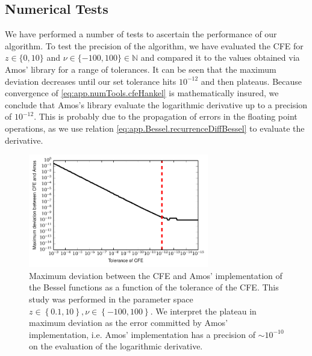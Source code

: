 
\subsection{Numerical Tests}
We have performed a number of tests to ascertain the performance of our algorithm. 
To test the precision of the algorithm, we have evaluated the CFE for $z\in\{0,10\}$
and $\nu\in\{-100,100\}\in\mathbb{N}$ and compared it to the values obtained via
Amos' library for a range of tolerances. It can be seen that the maximum deviation 
decreases until our set tolerance hits $10^{-12}$ and then plateaus. Because 
convergence of \ref{eq:app.numTools.cfeHankel} is mathematically insured, we 
conclude that Amos's library evaluate the logarithmic derivative up to 
a precision of $10^{-12}$. This is probably due to the propagation 
of errors in the floating point operations, as we use relation
\eqref{eq:app.Bessel.recurrenceDiffBessel}
to evaluate the derivative. 

\begin{figure}
 \centering
 \includegraphics[width=0.7\textwidth]{figs/app-numTools/maxDiff.pdf}
 \caption[Maximum deviation between the CFE and Amos' implementation as a function
	  of the CFE tolerance]%
	 {Maximum deviation between the CFE and Amos' implementation of the Bessel functions
	 as a function of the tolerance of the CFE. This study was performed in the parameter
	 space $z\in\left\{0.1,10\right\}, \nu\in\left\{-100,100\right\}$. We interpret 
	 the plateau in maximum deviation as the error committed by Amos' implementation, i.e.
	 Amos' implementation has a precision of $\sim10^{-10}$ on the evaluation of the logarithmic derivative.}
\end{figure}


